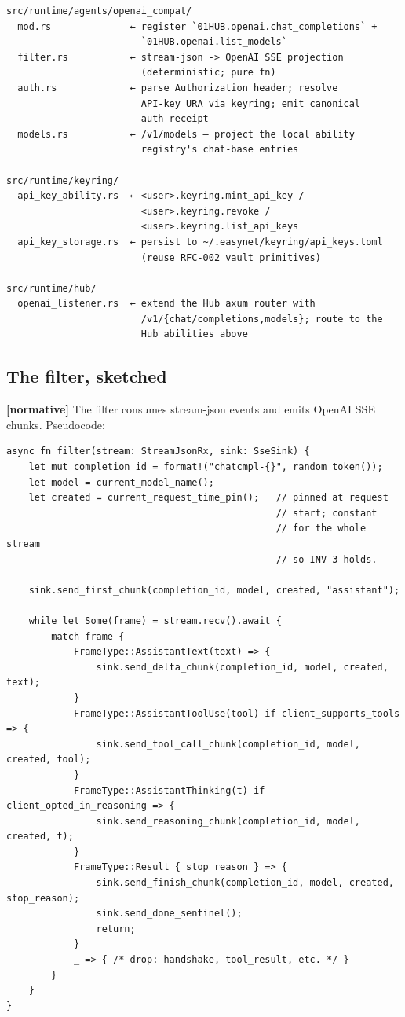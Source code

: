 \documentclass[11pt,a4paper]{article}
\newcommand{\normsv}{\textcolor{normativecolor}{\textbf{[normative]}}\xspace}
\theoremstyle{definition}
\begin{document}
\begin{lstlisting}
src/runtime/agents/openai_compat/
  mod.rs              ← register `01HUB.openai.chat_completions` +
                        `01HUB.openai.list_models`
  filter.rs           ← stream-json -> OpenAI SSE projection
                        (deterministic; pure fn)
  auth.rs             ← parse Authorization header; resolve
                        API-key URA via keyring; emit canonical
                        auth receipt
  models.rs           ← /v1/models — project the local ability
                        registry's chat-base entries

src/runtime/keyring/
  api_key_ability.rs  ← <user>.keyring.mint_api_key /
                        <user>.keyring.revoke /
                        <user>.keyring.list_api_keys
  api_key_storage.rs  ← persist to ~/.easynet/keyring/api_keys.toml
                        (reuse RFC-002 vault primitives)

src/runtime/hub/
  openai_listener.rs  ← extend the Hub axum router with
                        /v1/{chat/completions,models}; route to the
                        Hub abilities above
\end{lstlisting}

\subsection{The filter, sketched}

\normsv{} The filter consumes stream-json events and emits OpenAI
SSE chunks. Pseudocode:

\begin{lstlisting}
async fn filter(stream: StreamJsonRx, sink: SseSink) {
    let mut completion_id = format!("chatcmpl-{}", random_token());
    let model = current_model_name();
    let created = current_request_time_pin();   // pinned at request
                                                // start; constant
                                                // for the whole stream
                                                // so INV-3 holds.

    sink.send_first_chunk(completion_id, model, created, "assistant");

    while let Some(frame) = stream.recv().await {
        match frame {
            FrameType::AssistantText(text) => {
                sink.send_delta_chunk(completion_id, model, created, text);
            }
            FrameType::AssistantToolUse(tool) if client_supports_tools => {
                sink.send_tool_call_chunk(completion_id, model, created, tool);
            }
            FrameType::AssistantThinking(t) if client_opted_in_reasoning => {
                sink.send_reasoning_chunk(completion_id, model, created, t);
            }
            FrameType::Result { stop_reason } => {
                sink.send_finish_chunk(completion_id, model, created, stop_reason);
                sink.send_done_sentinel();
                return;
            }
            _ => { /* drop: handshake, tool_result, etc. */ }
        }
    }
}
\end{lstlisting}
\end{document}
